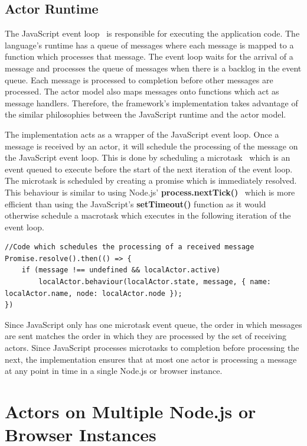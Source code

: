 \documentclass[oneside]{um-fict}
\begin{document}
\subsection{Actor Runtime}
The JavaScript event loop~\cite{eventloopbrowser, eventloopnode} is responsible for executing the application code. The language's runtime has a queue of messages where each message is mapped to a function which processes that message. The event loop waits for the arrival of a message and processes the queue of messages when there is a backlog in the event queue. Each message is processed to completion before other messages are processed. The actor model also maps messages onto functions which act as message handlers. Therefore, the framework's implementation takes advantage of the similar philosophies between the JavaScript runtime and the actor model.

The implementation acts as a wrapper of the JavaScript event loop. Once a message is received by an actor, it will schedule the processing of the message on the JavaScript event loop. This is done by scheduling a microtask~\cite{microtasks} which is an event queued to execute before the start of the next iteration of the event loop. The microtask is scheduled by creating a promise which is immediately resolved. This behaviour is similar to using Node.js' \textbf{process.nextTick()}~\cite{nexttick} which is more efficient than using the JavaScript's \textbf{setTimeout()} function as it would otherwise schedule a macrotask which executes in the following iteration of the event loop.
\begin{lstlisting}
//Code which schedules the processing of a received message
Promise.resolve().then(() => {
    if (message !== undefined && localActor.active)
        localActor.behaviour(localActor.state, message, { name: localActor.name, node: localActor.node });
})
\end{lstlisting}

Since JavaScript only has one microtask event queue, the order in which messages are sent matches the order in which they are processed by the set of receiving actors. Since JavaScript processes microtasks to completion before processing the next, the implementation ensures that at most one actor is processing a message at any point in time in a single Node.js or browser instance.

\section{Actors on Multiple Node.js or Browser Instances}
\end{document}
